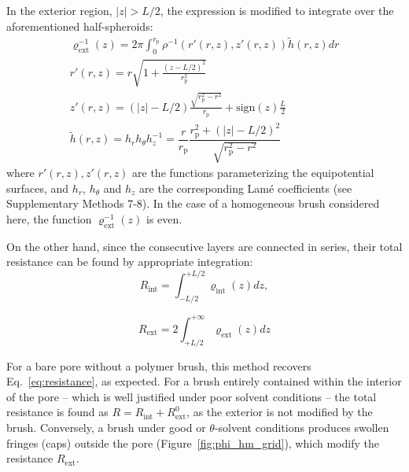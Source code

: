 \documentclass[12pt, a4paper]{article}
\begin{document}
In the exterior region, $|z| >L/2$, the expression is modified to integrate over the aforementioned half-spheroids:
\begin{equation}
    \begin{gathered}
        \varrho_{\text{ext}}^{-1}(z)= 2\pi\int_{0}^{r_{\text{p}}^{}} \rho^{-1}\left( r'(r,z), z'(r,z) \right)  \tilde{h} (r,z) dr\\
        r'(r,z) = r\sqrt{1 + \frac{(z - L/2)^2}{r_{\text{p}}^2}}\\
        z'(r,z) = (|z| - L/2) \frac{\sqrt{r_{\text{p}}^2 - r^2}}{r_{\text{p}}} +  \text{sign}(z) \frac{L}{2}\\
        \tilde{h} (r,z) = h_r h_{\theta} h_z^{-1} = \dfrac{r}{r_{\text{p}}}\dfrac{r_{\text{p}}^2 + (|z|-L/2)^2}{\sqrt{r_{\text{p}}^2 - r^2}}
    \end{gathered}
\label{eq:varrho2}
\end{equation}
where $r'(r,z) , z'(r,z)$ are the functions parameterizing the equipotential surfaces, and $h_r$, $h_{\theta}$ and $h_z$ are the corresponding Lam\'e coefficients (see Supplementary Methods 7-8). In the case of a homogeneous brush considered here, the function $\varrho_{\text{ext}}^{-1}(z)$ is even.

On the other hand, since the consecutive layers are connected in series, their total resistance can be found by appropriate integration:
\begin{equation}
    R_{\text{int}} = \int_{-L/2}^{+L/2}\varrho_{\text{int}}(z) dz,
    \label{R_int}
\end{equation}

\begin{equation}
   R_{\text{ext}} =2\int_{+L/2}^{+\infty}\varrho_{\text{ext}}(z)dz
    \label{R_ext}
\end{equation}

For a bare pore without a polymer brush, this method recovers Eq.~\ref{eq:resistance}, as expected.
For a brush entirely contained within the interior of the pore -- which is well justified under poor solvent conditions -- the total resistance is found as $R = R_{\text{int}} + R_{\text{ext}}^{0}$, as the exterior is not modified by the brush.
Conversely, a brush under good or $\theta$-solvent conditions produces swollen fringes (caps) outside the pore (Figure~\ref{fig:phi_hm_grid}), which modify the resistance $R_{\text{ext}}$.
\end{document}
